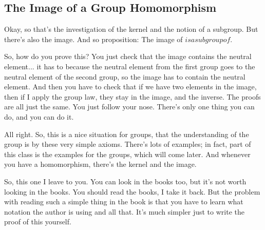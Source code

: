 \documentclass{article}
\begin{document}
\vspace*{14cm}
\subsection{The Image of a Group Homomorphism}
\begin{speech}[00:26:50 - 00:28:30]
Okay, so that's the investigation of the kernel and the notion of a subgroup. But there's also the image. And so proposition: The image of $ is a subgroup of $.

So, how do you prove this? You just check that the image contains the neutral element... it has to because the neutral element from the first group goes to the neutral element of the second group, so the image has to contain the neutral element. And then you have to check that if we have two elements in the image, then if I apply the group law, they stay in the image, and the inverse. The proofs are all just the same. You just follow your nose. There's only one thing you can do, and you can do it.

All right. So, this is a nice situation for groups, that the understanding of the group is by these very simple axioms. There's lots of examples; in fact, part of this class is the examples for the groups, which will come later. And whenever you have a homomorphism, there's the kernel and the image.

So, this one I leave to you. You can look in the books too, but it's not worth looking in the books. You should read the books, I take it back. But the problem with reading such a simple thing in the book is that you have to learn what notation the author is using and all that. It's much simpler just to write the proof of this yourself.
\end{speech}
\end{document}
